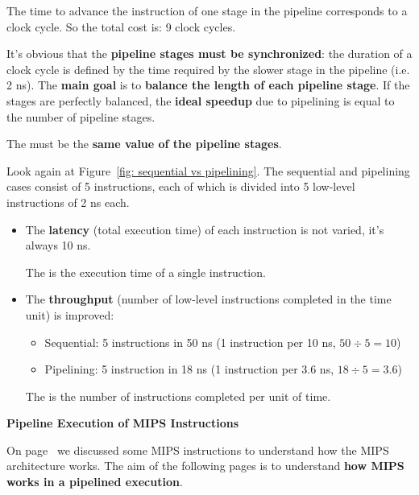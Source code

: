\newpage

\noindent
The time to advance the instruction of one stage in the pipeline corresponds to a clock cycle. So the total cost is: 9 clock cycles.

\highspace
It's obvious that the \textbf{pipeline stages must be synchronized}: the duration of a clock cycle is defined by the time required by the slower stage in the pipeline (i.e. 2 ns). The \textbf{main goal} is to \textbf{balance the length of each pipeline stage}. If the stages are perfectly balanced, the \textbf{ideal speedup} due to pipelining is equal to the number of pipeline stages.

\begin{definitionbox}
    The  must be the \textbf{same value of the pipeline stages}.
\end{definitionbox}

\highspace
Look again at Figure~\ref{fig: sequential vs pipelining}. The sequential and pipelining cases consist of 5 instructions, each of which is divided into 5 low-level instructions of 2 ns each.
\begin{itemize}
    \item The \textbf{latency} (total execution time) of each instruction is not varied, it's always 10 ns.
    \begin{definitionbox}
        The  is the execution time of a single instruction.
    \end{definitionbox}

    \item The \textbf{throughput} (number of low-level instructions completed in the time unit) is improved:
    \begin{itemize}
        \item Sequential: 5 instructions in 50 ns (1 instruction per 10 ns, $50 \div 5 = 10$)
        \item Pipelining: 5 instruction in 18 ns (1 instruction per 3.6 ns, $18 \div 5 = 3.6$)
    \end{itemize}
    \begin{definitionbox}
        The  is the number of instructions completed per unit of time.
    \end{definitionbox}
\end{itemize}

\newpage

\begin{center}
    \large
    \textcolor{Red3}{\textbf{Pipeline Execution of MIPS Instructions}}
\end{center}
On page~\pageref{Execution (EX) details} we discussed some MIPS instructions to understand how the MIPS architecture works. The aim of the following pages is to understand \textbf{how MIPS works in a pipelined execution}.

